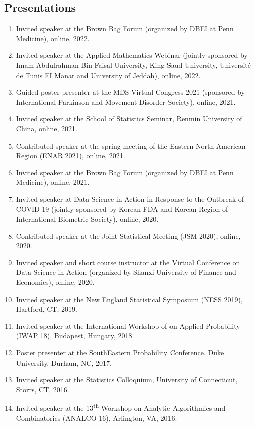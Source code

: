 \documentclass{res}
\begin{document}
\begin{resume}
\section{Presentations}
\begin{enumerate}
	\item Invited speaker at the Brown Bag Forum (organized by DBEI 
	at Penn Medicine), online, 2022.
	\item Invited speaker at the Applied Mathematics Webinar 
	(jointly sponsored by Imam Abdulrahman Bin Faisal University, 
	King Saud University, Universit\'{e} de Tunis EI Manar and 
	University of Jeddah), online, 2022.
	\item Guided poster presenter at the MDS Virtual Congress 2021 
	(sponsored by International Parkinson and Movement Disorder 
	Society), online, 2021.
	\item Invited speaker at the School of Statistics Seminar, 
	Renmin University of China, online, 2021.
	\item Contributed speaker at the spring meeting of the Eastern 
	North American Region (ENAR 2021), online, 2021.
	\item Invited speaker at the Brown Bag Forum (organized by DBEI 
	at Penn Medicine), online, 2021.
	\item Invited speaker at Data Science in Action in Response to 
	the Outbreak of COVID-19 (jointly sponsored by Korean FDA and 
	Korean Region of International Biometric Society), online, 2020.
	\item Contributed speaker at the Joint Statistical Meeting (JSM 
	2020), 
	online, 2020.
	\item Invited speaker and short course instructor at the Virtual 
	Conference on Data Science in Action (organized by Shanxi 
	University of Finance and Economics), online, 2020.
	\item Invited speaker at the New England Statistical Symposium (NESS 2019), Hartford, CT, 2019.
	\item Invited speaker at the International Workshop of on Applied Probability (IWAP 18), Budapest, Hungary, 2018.
	\item Poster presenter at the SouthEastern Probability Conference, Duke University, Durham, NC, 2017.
	\item Invited speaker at the Statistics Colloquium, University of Connecticut, Storrs, CT, 2016.
	\item Invited speaker at the 13\textsuperscript{th} Workshop on Analytic Algorithmics and Combinatorics (ANALCO 16), Arlington, VA, 2016.

\end{enumerate}
\end{resume}
\end{document}
